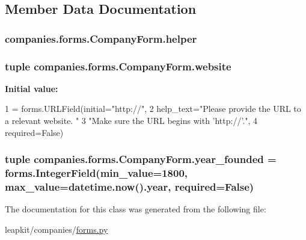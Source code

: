 \subsection{Member Data Documentation}
\hypertarget{classcompanies_1_1forms_1_1_company_form_a03384adb1123519cffd3b8cafba44458}{
\subsubsection[{helper}]{\setlength{\rightskip}{0pt plus 5cm}companies.\-forms.\-Company\-Form.\-helper}}\label{classcompanies_1_1forms_1_1_company_form_a03384adb1123519cffd3b8cafba44458}
\hypertarget{classcompanies_1_1forms_1_1_company_form_a295f4e2a9def75781c3ac2212936b862}{
\subsubsection[{website}]{\setlength{\rightskip}{0pt plus 5cm}tuple companies.\-forms.\-Company\-Form.\-website\hspace{0.3cm}{\ttfamily [static]}}}\label{classcompanies_1_1forms_1_1_company_form_a295f4e2a9def75781c3ac2212936b862}
{\bfseries Initial value\-:}
\begin{DoxyCode}
1 = forms.URLField(initial=\textcolor{stringliteral}{"http://"},
2                              help\_text=\textcolor{stringliteral}{"Please provide the URL to a relevant website. "}
3                                        \textcolor{stringliteral}{"Make sure the URL begins with 'http://'."},
4                              required=\textcolor{keyword}{False})
\end{DoxyCode}
\hypertarget{classcompanies_1_1forms_1_1_company_form_a28acc2dfce7e83ec0d85215a9d52fc5b}{
\subsubsection[{year\-\_\-founded}]{\setlength{\rightskip}{0pt plus 5cm}tuple companies.\-forms.\-Company\-Form.\-year\-\_\-founded = forms.\-Integer\-Field(min\-\_\-value=1800, max\-\_\-value=datetime.\-now().year, required=False)\hspace{0.3cm}{\ttfamily [static]}}}\label{classcompanies_1_1forms_1_1_company_form_a28acc2dfce7e83ec0d85215a9d52fc5b}


The documentation for this class was generated from the following file\-:\begin{DoxyCompactItemize}
\item 
leapkit/companies/\hyperlink{companies_2forms_8py}{forms.\-py}\end{DoxyCompactItemize}

